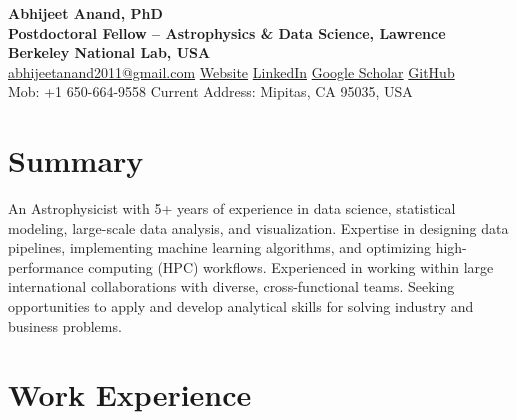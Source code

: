 \documentclass[a4paper,10pt]{article}
\begin{document}
\begin{center}
    {\huge \textbf{Abhijeet Anand, PhD}} \\
    {\normalsize \vspace{1.5mm}
    \textbf{Postdoctoral Fellow – Astrophysics \& Data Science, Lawrence Berkeley National Lab, USA}} \\
    \vspace{1.5mm}
\href{mailto:abhijeetanand2011@gmail.com}{abhijeetanand2011@gmail.com} \quad 
    \href{https://abhi0395.github.io}{Website} \quad
    \href{https://www.linkedin.com/in/abhijeet-anand-iisc}{LinkedIn} \quad
    \href{https://scholar.google.com/citations?hl=en&user=MfOuq1IAAAAJ}{Google Scholar} \quad
    \href{https://github.com/abhi0395}{GitHub}\\
    \vspace{1.5mm}
    Mob: +1 650-664-9558
     \quad 
    Current Address: Mipitas, CA 95035, USA \quad 
\end{center}

\section*{Summary}
An Astrophysicist with 5+ years of experience in data science, statistical modeling, large-scale data analysis, and visualization. Expertise in designing data pipelines, implementing machine learning algorithms, and optimizing high-performance computing (HPC) workflows. Experienced in working within large international collaborations with diverse, cross-functional teams. Seeking opportunities to apply and develop analytical skills for solving industry and business problems.
\vspace*{-3mm}
\section*{Work Experience}
\end{document}
